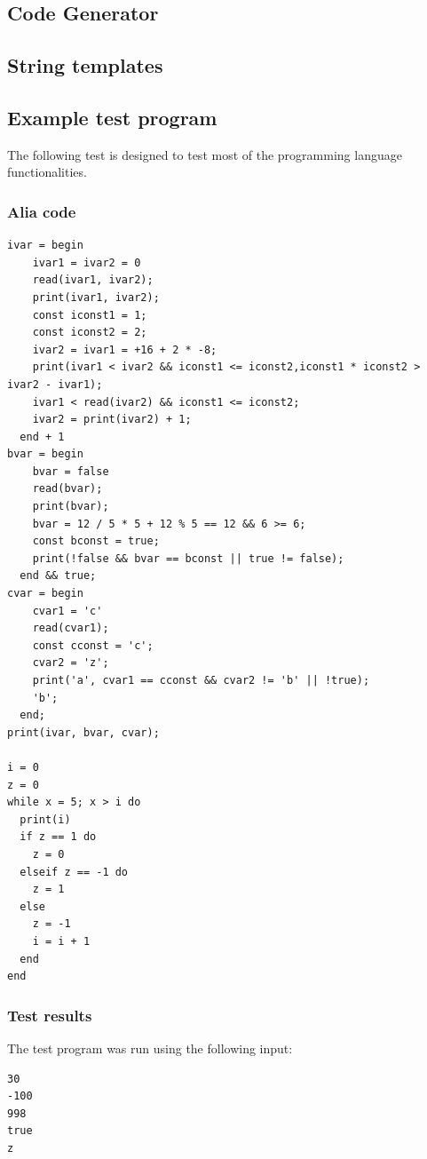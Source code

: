 \documentclass[paper=a4, fontsize=11pt]{article}
\numberwithin{equation}{section}		%
\numberwithin{figure}{section}			%
\numberwithin{table}{section}				%
\begin{document}


\subsection{Code Generator}



\subsection{String templates}


\restoregeometry

\subsection{Example test program}
\label{testprogram}
The following test is designed to test most of the programming language functionalities.

\subsubsection{Alia code}
\begin{lstlisting}[style=muchcode]
ivar = begin
    ivar1 = ivar2 = 0
    read(ivar1, ivar2);
    print(ivar1, ivar2);
    const iconst1 = 1;
    const iconst2 = 2;
    ivar2 = ivar1 = +16 + 2 * -8;
    print(ivar1 < ivar2 && iconst1 <= iconst2,iconst1 * iconst2 > ivar2 - ivar1);
    ivar1 < read(ivar2) && iconst1 <= iconst2;
    ivar2 = print(ivar2) + 1;
  end + 1
bvar = begin
    bvar = false
    read(bvar);
    print(bvar);
    bvar = 12 / 5 * 5 + 12 % 5 == 12 && 6 >= 6;
    const bconst = true;
    print(!false && bvar == bconst || true != false);
  end && true;
cvar = begin
    cvar1 = 'c'
    read(cvar1);
    const cconst = 'c';
    cvar2 = 'z';
    print('a', cvar1 == cconst && cvar2 != 'b' || !true);
    'b';
  end;
print(ivar, bvar, cvar);

i = 0
z = 0
while x = 5; x > i do
  print(i)
  if z == 1 do
    z = 0
  elseif z == -1 do
    z = 1
  else
    z = -1
    i = i + 1
  end
end
\end{lstlisting}

\subsubsection{Test results}
The test program was run using the following input:
\begin{lstlisting}
30
-100
998
true
z
\end{lstlisting}
\end{document}
